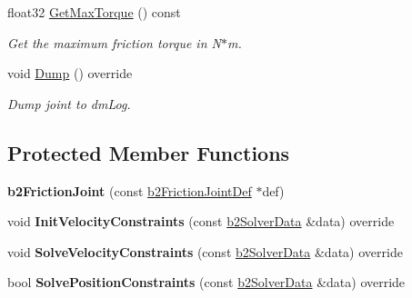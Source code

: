 \begin{DoxyCompactItemize}
float32 \hyperlink{classb2_friction_joint_ae926972faa5846436cbcfe5772adc1f6}{Get\+Max\+Torque} () const
\begin{DoxyCompactList}\small\item\em Get the maximum friction torque in N$\ast$m. \end{DoxyCompactList}\item 
\mbox{\label{classb2_friction_joint_a934a3ce5bda09bc07111c1dd4e192406}} 
void \hyperlink{classb2_friction_joint_a934a3ce5bda09bc07111c1dd4e192406}{Dump} () override
\begin{DoxyCompactList}\small\item\em Dump joint to dm\+Log. \end{DoxyCompactList}\end{DoxyCompactItemize}
\subsection*{Protected Member Functions}
\begin{DoxyCompactItemize}
\item 
\mbox{\label{classb2_friction_joint_a7413c5f289257f0e993b7e750fe95b99}} 
{\bfseries b2\+Friction\+Joint} (const \hyperlink{structb2_friction_joint_def}{b2\+Friction\+Joint\+Def} $\ast$def)
\item 
\mbox{\label{classb2_friction_joint_afce4006666e83c50d2017b5ff5e7ca2d}} 
void {\bfseries Init\+Velocity\+Constraints} (const \hyperlink{structb2_solver_data}{b2\+Solver\+Data} \&data) override
\item 
\mbox{\label{classb2_friction_joint_a49109c1785d949e99a809a8c297abf13}} 
void {\bfseries Solve\+Velocity\+Constraints} (const \hyperlink{structb2_solver_data}{b2\+Solver\+Data} \&data) override
\item 
\mbox{\label{classb2_friction_joint_a4e4b64b634299136bc2c7096d5c28aa8}} 
bool {\bfseries Solve\+Position\+Constraints} (const \hyperlink{structb2_solver_data}{b2\+Solver\+Data} \&data) override
\end{DoxyCompactItemize}
